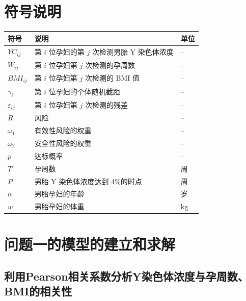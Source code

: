 \documentclass[withoutpreface,bwprint]{cumcmthesis}
\begin{document}
\section{符号说明}
\begin{table}[H]
\centering
\renewcommand{\arraystretch}{1.7}
\setlength{\tabcolsep}{2em}
\renewcommand{\heavyrulewidth}{1.2pt}
\begin{tabularx}{\textwidth}{p{1cm} >{\centering\arraybackslash}X p{1cm}}
\toprule
符号 & 说明 & \hspace{-10pt}单位 \\
\midrule
$YC_{ij}$ & 第 $i$ 位孕妇的第 $j$ 次检测男胎 Y 染色体浓度 & -- \\
$W_{ij}$  & 第 $i$ 位孕妇第 $j$ 次检测的孕周数 & -- \\
$BMI_{ij}$& 第 $i$ 位孕妇第 $j$ 次检测的 BMI 值 & -- \\
$\gamma_i$& 第 $i$ 位孕妇的个体随机截距 & -- \\
$\varepsilon_{ij}$& 第 $i$ 位孕妇第 $j$ 次检测的残差 & -- \\
$R$       & 风险 & -- \\
$\omega_1$& 有效性风险的权重 & -- \\
$\omega_2$& 安全性风险的权重 & -- \\
$p$       & 达标概率 & -- \\
$T$       & 孕周数 & 周 \\
$P$       & 男胎 Y 染色体浓度达到 4\%的时点 & 周 \\
$\alpha$  & 男胎孕妇的年龄 & 岁 \\
$w$       & 男胎孕妇的体重 & kg \\
\bottomrule
\end{tabularx}
\label{tab:符号说明}
\end{table}



\section{问题一的模型的建立和求解}
\subsection{利用Pearson相关系数分析Y染色体浓度与孕周数、BMI的相关性}
\label{5.1}
\end{document}
